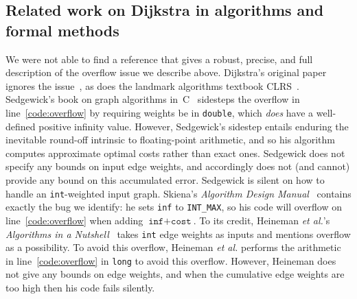 \subsection{Related work on Dijkstra in algorithms and formal methods}
\label{sec:relworkdijkstra}
We were not able to find a reference that gives a robust, precise,
and full description of the overflow issue we describe above.
Dijkstra's original paper ignores the issue~\cite{DBLP:journals/nm/Dijkstra59}, as does the landmark algorithms textbook CLRS~\cite{clrs}. %
Sedgewick's book on graph algorithms in~C~\cite{sedgewick} sidesteps the overflow in line~\ref{code:overflow} by requiring weights be in \texttt{double}, which \emph{does} have a well-defined positive infinity value.  However, Sedgewick's sidestep entails enduring the inevitable round-off intrinsic to floating-point arithmetic, and so his algorithm computes approximate optimal costs rather than exact ones.  Sedgewick does not specify any bounds on input edge weights, and accordingly does not (and cannot) provide any bound on this accumulated error.  Sedgewick is silent on how to handle an \texttt{int}-weighted input graph.  Skiena's \emph{Algorithm Design Manual}~\cite{DBLP:books/daglib/0022194} contains exactly the bug we identify: he sets \texttt{inf} to \texttt{INT\_MAX}, so his code will overflow on
line~\ref{code:overflow} when adding $\texttt{inf} + \texttt{cost}$.
To its credit, Heineman \emph{et al.}'s \emph{Algorithms in a Nutshell}~\cite{heineman2008algorithms} takes \texttt{int} edge weights as inputs and mentions overflow as a possibility.  To avoid this overflow, Heineman \emph{et al.} performs the arithmetic in line~\ref{code:overflow} in \texttt{long} to avoid this overflow.  However, Heineman does not give any bounds on edge weights, and when the cumulative edge weights are too high then his code fails silently. %



